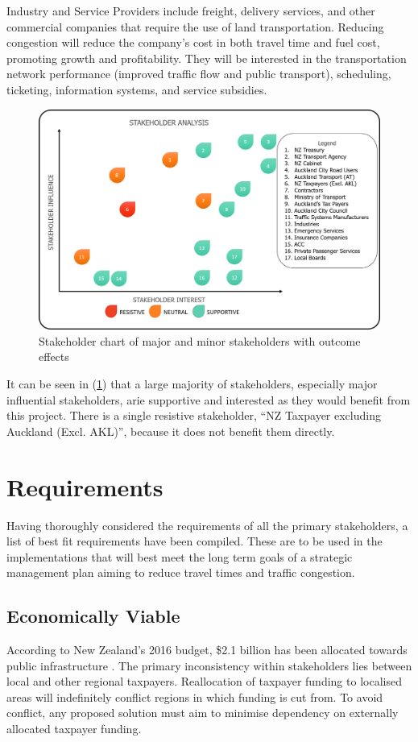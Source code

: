 \documentclass[twoside, a4paper, 11pt]{article}
\begin{document}
Industry and Service Providers include freight, delivery services, and other commercial companies that require the use of land transportation. Reducing congestion will reduce the company's cost in both travel time and fuel cost, promoting growth and profitability. They will be interested in the transportation network performance (improved traffic flow and public transport), scheduling, ticketing, information systems, and service subsidies.

\begin{figure}
\centering
\includegraphics[width=\textwidth]{Picture5.png}
\caption{Stakeholder chart of major and minor stakeholders with outcome effects}
\label{fig:stakeholder}
\end{figure}

It can be seen in  (\cref{fig:stakeholder}) that a large majority of stakeholders, especially major influential stakeholders, arie supportive and interested as they would benefit from this project. There is a single resistive stakeholder, ``NZ Taxpayer excluding Auckland (Excl. AKL)'', because it does not benefit them directly.
\newpage


\section{Requirements}
Having thoroughly considered the requirements of all the primary stakeholders, a list of best fit requirements have been compiled. These are to be used in the implementations that will best meet the long term goals of a strategic management plan aiming to reduce travel times and traffic congestion.

\subsection{Economically Viable}
According to New Zealand's 2016 budget, \$2.1 billion has been allocated towards public infrastructure \citep{gov2016}. The primary inconsistency within stakeholders lies between local and other regional taxpayers. Reallocation of taxpayer funding to localised areas will indefinitely conflict regions in which funding is cut from. To avoid conflict, any proposed solution must aim to minimise dependency on externally allocated taxpayer funding.
\end{document}
